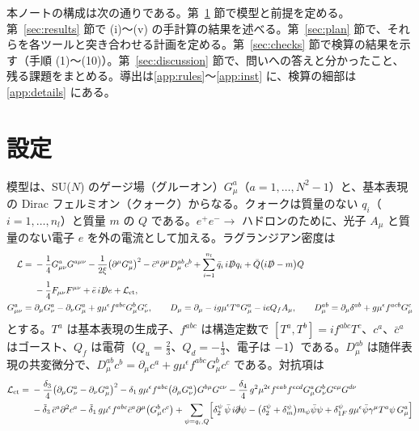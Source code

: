 \documentclass[a4paper,10pt]{ltjsarticle}
\begin{document}
本ノートの構成は次の通りである。第~\ref{sec:setup} 節で模型と前提を定める。第~\ref{sec:results} 節で (i)〜(v) の手計算の結果を述べる。第~\ref{sec:plan} 節で、それらを各ツールと突き合わせる計画を定める。第~\ref{sec:checks} 節で検算の結果を示す（手順 (1)〜(10)）。第~\ref{sec:discussion} 節で、問いへの答えと分かったこと、残る課題をまとめる。導出は\ref{app:rules}〜\ref{app:inst} に、検算の細部は\ref{app:details} にある。

\section{設定}\label{sec:setup}

模型は、SU($N$) のゲージ場（グルーオン）$G^a_\mu$（$a=1,\dots,N^2-1$）と、基本表現の Dirac フェルミオン（クォーク）からなる。クォークは質量のない $q_i$（$i=1,\dots,n_l$）と質量 $m$ の $Q$ である。$e^+e^-\to$ ハドロンのために、光子 $A_\mu$ と質量のない電子 $e$ を外の電流として加える。ラグランジアン密度は
\begin{equation}
\begin{aligned}
\mathcal{L}={}&-\frac14G^a_{\mu\nu}G^{a\mu\nu}-\frac{1}{2\xi}\bigl(\partial^\mu G^a_\mu\bigr)^2-\bar c^a\partial^\mu D_\mu^{ab}c^b
+\sum_{i=1}^{n_l}\bar q_i\,i\slashed Dq_i+\bar Q\bigl(i\slashed D-m\bigr)Q\\
&-\frac14F_{\mu\nu}F^{\mu\nu}+\bar e\,i\slashed De+\mathcal L_{\mathrm{ct}},\\
G^a_{\mu\nu}={}&\partial_\mu G^a_\nu-\partial_\nu G^a_\mu+g\mu^\epsilon f^{abc}G^b_\mu G^c_\nu,\qquad
D_\mu=\partial_\mu-ig\mu^\epsilon T^aG^a_\mu-ieQ_fA_\mu,\qquad
D_\mu^{ab}=\partial_\mu\delta^{ab}+g\mu^\epsilon f^{acb}G^c_\mu
\end{aligned}
\label{eq:L}
\end{equation}
とする。$T^a$ は基本表現の生成子、$f^{abc}$ は構造定数で $[T^a,T^b]=if^{abc}T^c$、$c^a$、$\bar c^a$ はゴースト、$Q_f$ は電荷（$Q_u=\frac23$、$Q_d=-\frac13$、電子は $-1$）である。$D_\mu^{ab}$ は随伴表現の共変微分で、$D_\mu^{ab}c^b=\partial_\mu c^a+g\mu^\epsilon f^{abc}G^b_\mu c^c$ である。対抗項は
\begin{equation*}
\begin{aligned}
\mathcal L_{\mathrm{ct}}={}&-\frac{\delta_3}{4}\bigl(\partial_\mu G^a_\nu-\partial_\nu G^a_\mu\bigr)^2
-\delta_1\,g\mu^\epsilon f^{abc}\bigl(\partial_\mu G^a_\nu\bigr)G^{b\mu}G^{c\nu}
-\frac{\delta_4}{4}\,g^2\mu^{2\epsilon}f^{eab}f^{ecd}G^a_\mu G^b_\nu G^{c\mu}G^{d\nu}\\
&-\tilde\delta_3\,\bar c^a\partial^2c^a-\tilde\delta_1\,g\mu^\epsilon f^{abc}\bar c^a\partial^\mu\bigl(G^b_\mu c^c\bigr)
+\sum_{\psi=q_i,Q}\Bigl[\delta_2^\psi\,\bar\psi\,i\slashed\partial\psi-\bigl(\delta_2^\psi+\delta_m^\psi\bigr)m_\psi\bar\psi\psi+\delta_{1F}^\psi\,g\mu^\epsilon\bar\psi\gamma^\mu T^a\psi\,G^a_\mu\Bigr]
\end{aligned}
\end{equation*}
\end{document}
